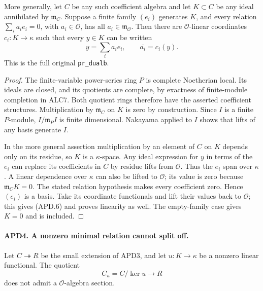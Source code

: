 \documentclass[11pt,a4paper]{article}
\numberwithin{equation}{section}
\theoremstyle{remark}\newtheorem{remark}[theorem]{Remark}
\begin{document}
More generally, let \(C\) be any such coefficient algebra and
let \(K\subset C\) be any ideal annihilated by
\(\mathfrak m_C\).  Suppose a finite family \((e_i)\)
generates \(K\), and every relation
\(\sum_i a_ie_i=0\), with \(a_i\in\mathcal O\), has all
\(a_i\in\mathfrak m_{\mathcal O}\).  Then there are
\(\mathcal O\)-linear coordinates \(c_i:K\to\kappa\) such
that every \(y\in K\) can be written
\[
 y=\sum_i a_ie_i,\qquad \overline{a_i}=c_i(y).
                                                               \tag{APD.6}
\]
This is the full original \texttt{pr\_\allowbreak dualb}.

\begin{proof}
The finite-variable power-series ring \(P\) is complete
Noetherian local.  Its ideals are closed, and its quotients are
complete, by exactness of finite-module completion in ALC7.
Both quotient rings therefore have the asserted coefficient
structures.  Multiplication by \(\mathfrak m_C\) on \(K\)
is zero by construction.  Since \(I\) is a finite \(P\)-module,
\(I/\mathfrak m_PI\) is finite dimensional.  Nakayama applied
to \(I\) shows that lifts of any basis generate \(I\).

In the more general assertion multiplication by an element of \(C\)
on \(K\) depends only on its residue, so \(K\) is a
\(\kappa\)-space.  Any ideal expression for \(y\) in terms
of the \(e_i\) can replace its coefficients in \(C\) by
residue lifts from \(\mathcal O\).  Thus the \(e_i\) span
over \(\kappa\).  A linear dependence over \(\kappa\)
can also be lifted to \(\mathcal O\); its value is zero because
\(\mathfrak m_CK=0\).  The stated relation hypothesis makes
every coefficient zero.  Hence \((e_i)\) is a basis.
Take its coordinate functionals and lift their values back to
\(\mathcal O\); this gives (APD.6) and proves linearity as well.
The empty-family case gives \(K=0\) and is included.
\end{proof}

\paragraph{APD4. A nonzero minimal relation cannot split off.}
\label{claim:APD4}
Let \(C\twoheadrightarrow R\) be the small extension of APD3,
and let \(u:K\to\kappa\) be a nonzero linear functional.
The quotient
\[
 C_u=C/\ker u\longrightarrow R                            \tag{APD.7}
\]
does not admit a \(\mathcal O\)-algebra section.
\end{document}
